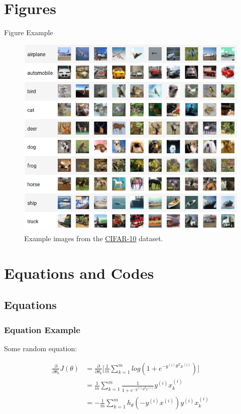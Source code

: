 \documentclass{SKP-beamer}
\begin{document}
\section{Figures}

\begin{frame}{Figure Example} 

\begin{figure}
\centering
\includegraphics[scale=0.25]{images/cifar10.png}
\caption{Example images from the \href{http://www.cs.toronto.edu/~kriz/cifar.html}{CIFAR-10} dataset.}
\end{figure}

\end{frame}

\section{Equations and Codes}
\subsection{Equations}
\begin{frame}
\frametitle{Equation Example}
Some random equation:

\begin{align*}
    \frac{\partial}{\partial \theta_k}J(\theta) 
        &= \frac{\partial}{\partial \theta_k}\Bigg[\frac{1}{m}\sum_{k=1}^m log(1+e^{-y^{(i)}\theta^Tx^{(i)}})\Bigg] \\
        &= \frac{1}{m}\sum_{k=1}^m \frac{1}{1+e^{-y^{(i)}\theta^Tx^{(i)}}}y^{(i)}x_k^{(i)} \\
        &= -\frac{1}{m}\sum_{k=1}^m h_\theta(-y^{(i)}x^{(i)})y^{(i)}x_k^{(i)}        
\end{align*}

\end{frame}
\end{document}
